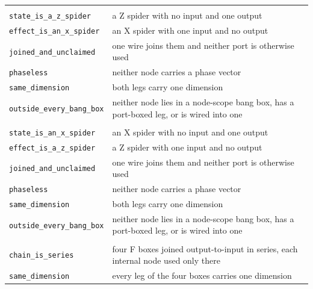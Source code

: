 \begin{xltabular}{\textwidth}{@{}>{\raggedright\arraybackslash}p{0.42\textwidth}>{\raggedright\arraybackslash}X@{}}
\midrule
{}\\
\quad\texttt{state\_\allowbreak{}is\_\allowbreak{}a\_\allowbreak{}z\_\allowbreak{}spider} & a Z spider with no input and one output \\
\quad\texttt{effect\_\allowbreak{}is\_\allowbreak{}an\_\allowbreak{}x\_\allowbreak{}spider} & an X spider with one input and no output \\
\quad\texttt{joined\_\allowbreak{}and\_\allowbreak{}unclaimed} & one wire joins them and neither port is otherwise used \\
\quad\texttt{phaseless} & neither node carries a phase vector \\
\quad\texttt{same\_\allowbreak{}dimension} & both legs carry one dimension \\
\quad\texttt{outside\_\allowbreak{}every\_\allowbreak{}bang\_\allowbreak{}box} & neither node lies in a node-scope bang box, has a port-boxed leg, or is wired into one \\
\midrule
{}\\
\quad\texttt{state\_\allowbreak{}is\_\allowbreak{}an\_\allowbreak{}x\_\allowbreak{}spider} & an X spider with no input and one output \\
\quad\texttt{effect\_\allowbreak{}is\_\allowbreak{}a\_\allowbreak{}z\_\allowbreak{}spider} & a Z spider with one input and no output \\
\quad\texttt{joined\_\allowbreak{}and\_\allowbreak{}unclaimed} & one wire joins them and neither port is otherwise used \\
\quad\texttt{phaseless} & neither node carries a phase vector \\
\quad\texttt{same\_\allowbreak{}dimension} & both legs carry one dimension \\
\quad\texttt{outside\_\allowbreak{}every\_\allowbreak{}bang\_\allowbreak{}box} & neither node lies in a node-scope bang box, has a port-boxed leg, or is wired into one \\
\midrule
{}\\
\quad\texttt{chain\_\allowbreak{}is\_\allowbreak{}series} & four F boxes joined output-to-input in series, each internal node used only there \\
\quad\texttt{same\_\allowbreak{}dimension} & every leg of the four boxes carries one dimension \\

\end{xltabular}
